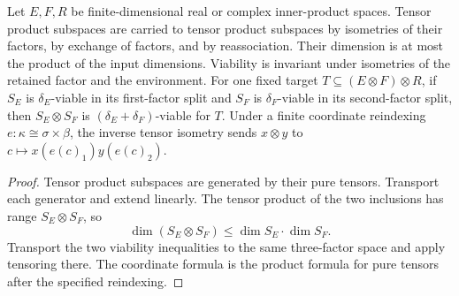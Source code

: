 \begin{lemma}
    \label{thm:viable_tensor_factor_changes}
    \leanok
    Let $E,F,R$ be finite-dimensional real or complex inner-product spaces.
    Tensor product subspaces are carried to tensor product subspaces by
    isometries of their factors, by exchange of factors, and by reassociation.
    Their dimension is at most the product of the input dimensions.
    Viability is invariant under isometries of the retained factor and the
    environment. For one fixed target $T\subseteq(E\otimes F)\otimes R$,
    if $S_E$ is $\delta_E$-viable in its first-factor split and $S_F$ is
    $\delta_F$-viable in its second-factor split, then $S_E\otimes S_F$
    is $(\delta_E+\delta_F)$-viable for $T$.
    Under a finite coordinate reindexing $e:\kappa\cong\sigma\times\beta$,
    the inverse tensor isometry sends $x\otimes y$ to
    $c\mapsto x(e(c)_1)y(e(c)_2)$.
\end{lemma}
\begin{proof}\leanok
    Tensor product subspaces are generated by their pure tensors.
    Transport each generator and extend linearly. The tensor product of
    the two inclusions has range $S_E\otimes S_F$, so
    \[
        \dim(S_E\otimes S_F)\le\dim S_E\cdot\dim S_F.
    \]
    Transport the two viability inequalities to the same three-factor
    space and apply tensoring there. The coordinate formula is the
    product formula for pure tensors after the specified reindexing.
\end{proof}


